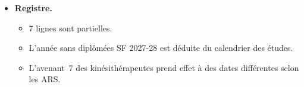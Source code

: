 \begin{itemize}
  \begin{itemize}
    \item L'Annuaire est un instantané de novembre, la DREES compte au 1\textsuperscript{er} janvier. 11,5\,\% des
    activités dentaires n'y ont pas de commune.
    \item Le seuil de 30 est une convention, que seul le banc peut remplacer.
  \end{itemize}
  \item \textbf{Registre.}
  \begin{itemize}
    \item 7 lignes sont partielles.
    \item L'année sans diplômées SF 2027-28 est déduite du calendrier des études.
    \item L'avenant~7 des kinésithérapeutes prend effet à des dates différentes selon les ARS.
  \end{itemize}
\end{itemize}

